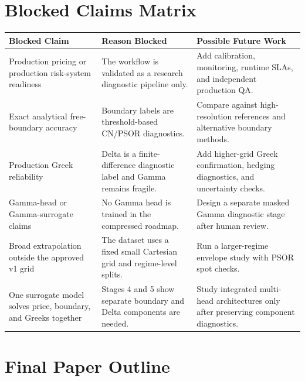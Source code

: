 \documentclass[11pt,a4paper]{article}
\begin{document}
\section{Blocked Claims Matrix}

\begin{longtable}{L{0.28\textwidth} L{0.33\textwidth} L{0.30\textwidth}}
\toprule
Blocked Claim & Reason Blocked & Possible Future Work \\
\midrule
\endhead
Production pricing or production risk-system readiness & The workflow is validated as a research diagnostic pipeline only. & Add calibration, monitoring, runtime SLAs, and independent production QA. \\
Exact analytical free-boundary accuracy & Boundary labels are threshold-based CN/PSOR diagnostics. & Compare against high-resolution references and alternative boundary methods. \\
Production Greek reliability & Delta is a finite-difference diagnostic label and Gamma remains fragile. & Add higher-grid Greek confirmation, hedging diagnostics, and uncertainty checks. \\
Gamma-head or Gamma-surrogate claims & No Gamma head is trained in the compressed roadmap. & Design a separate masked Gamma diagnostic stage after human review. \\
Broad extrapolation outside the approved v1 grid & The dataset uses a fixed small Cartesian grid and regime-level splits. & Run a larger-regime envelope study with PSOR spot checks. \\
One surrogate model solves price, boundary, and Greeks together & Stages 4 and 5 show separate boundary and Delta components are needed. & Study integrated multi-head architectures only after preserving component diagnostics. \\
\bottomrule
\end{longtable}

\section{Final Paper Outline}
\end{document}
